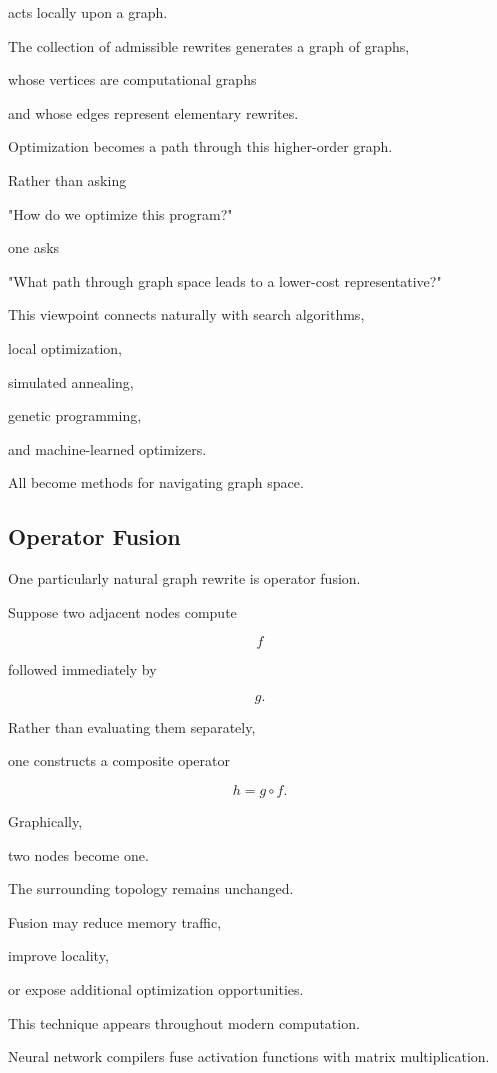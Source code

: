 \documentclass[12pt,oneside]{article}
\begin{document}
acts locally upon a graph.

The collection of admissible rewrites generates a graph of graphs,

whose vertices are computational graphs

and whose edges represent elementary rewrites.

Optimization becomes a path through this higher-order graph.

Rather than asking

"How do we optimize this program?"

one asks

"What path through graph space leads to a lower-cost representative?"

This viewpoint connects naturally with search algorithms,

local optimization,

simulated annealing,

genetic programming,

and machine-learned optimizers.

All become methods for navigating graph space.

\subsection{Operator Fusion}

One particularly natural graph rewrite is operator fusion.

Suppose two adjacent nodes compute

\[
f
\]

followed immediately by

\[
g.
\]

Rather than evaluating them separately,

one constructs a composite operator

\[
h
=
g\circ f.
\]

Graphically,

two nodes become one.

The surrounding topology remains unchanged.

Fusion may reduce memory traffic,

improve locality,

or expose additional optimization opportunities.

This technique appears throughout modern computation.

Neural network compilers fuse activation functions with matrix multiplication.
\end{document}
